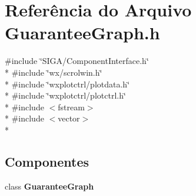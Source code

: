 \section{Referência do Arquivo Guarantee\+Graph.\+h}
\label{_guarantee_graph_8h}
{\ttfamily \#include \char`\"{}S\+I\+G\+A/\+Component\+Interface.\+h\char`\"{}}\\*
{\ttfamily \#include \char`\"{}wx/scrolwin.\+h\char`\"{}}\\*
{\ttfamily \#include \char`\"{}wxplotctrl/plotdata.\+h\char`\"{}}\\*
{\ttfamily \#include \char`\"{}wxplotctrl/plotctrl.\+h\char`\"{}}\\*
{\ttfamily \#include $<$fstream$>$}\\*
{\ttfamily \#include $<$vector$>$}\\*
\subsection*{Componentes}
\begin{DoxyCompactItemize}
\item 
class {\bf Guarantee\+Graph}
\end{DoxyCompactItemize}
